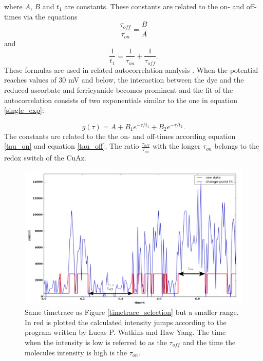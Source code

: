 \documentclass[twoside,single]{lion-msc}
\begin{document}
where $A$, $B$ and $t_{1}$ are constants. These constants are related to the on- and off-times via the equations
\begin{equation}\label{tau_on}
\frac{\tau_{off}}{\tau_{on}} = \frac{B}{A}
\end{equation}
and
\begin{equation}\label{tau_off}
\frac{1}{t_{1}} = \frac{1}{\tau_{on}} + \frac{1}{\tau_{off}}.
\end{equation}
These formulas are used in related autocorrelation analysis \cite{Vosch2007}. When the potential reaches values of 30 mV and below, the interaction between the dye and the reduced ascorbate and ferricyanide becomes prominent and the fit of the autocorrelation consists of two exponentials similar to the one in equation \ref{single_exp}:

\begin{equation}\label{multi_exp}
g(\tau) = A +  B_{1}e^{-\tau/t_{1}} + B_{2}e^{-\tau/t_{2}}. 
\end{equation}
The constants are related to the the on- and off-times according equation \ref{tau_on} and equation \ref{tau_off}. The ratio $\frac{\tau_{off}}{\tau_{on}}$ with the longer $\tau_{on}$ belongs to the redox switch of the CuAz.

\begin{figure}[ht!]
\centering
\includegraphics[width=\textwidth]{on_off_test1}
\caption{Same timetrace as Figure \ref{timetrace_selection} but a smaller range. In red is plotted the calculated intensity jumps according to the program written by Lucas P. Watkins and Haw Yang. The time when the intensity is low is referred to as the $\tau_{off}$ and the time the molecules intensity is high is the $\tau_{on}$.}
\label{on_off_times}
\end{figure}
\end{document}
